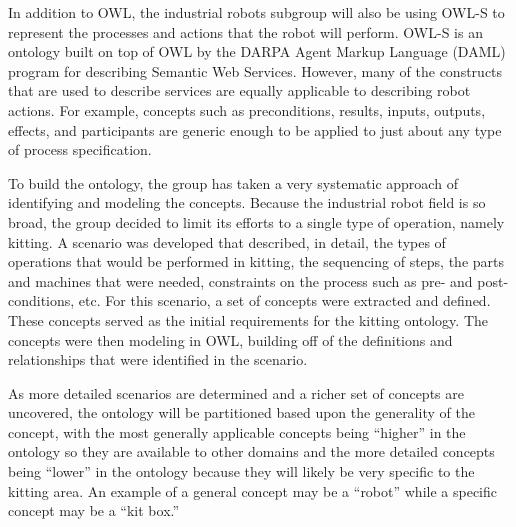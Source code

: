 \documentclass[a4paper, 10pt, conference]{ieeeconf}      %
\begin{document}
In addition to OWL, the industrial robots subgroup will also be using OWL-S \cite{Martin2012} to represent the processes and actions that the robot will perform. OWL-S is an ontology built on top of OWL by the DARPA Agent Markup Language (DAML) program \cite{damlWeb}
for describing Semantic Web Services. However, many of the constructs that are used to describe services are equally applicable to describing robot actions. For example, concepts such as preconditions, results, inputs, outputs, effects, and participants are generic enough to be applied to just about any type of process specification.

To build the ontology, the group has taken a very systematic approach of identifying and modeling the concepts. Because the industrial robot field is so broad, the group decided to limit its efforts to a single type of operation, namely kitting. A scenario was developed that described, in detail, the types of operations that would be performed in kitting, the sequencing of steps, the parts and machines that were needed, constraints on the process such as pre- and post-conditions, etc. For this scenario, a set of concepts were extracted and defined. These concepts served as the initial requirements for the kitting ontology. The concepts were then modeling in OWL, building off of the definitions and relationships that were identified in the scenario.

As more detailed scenarios are determined and a richer set of concepts are uncovered, the ontology will be partitioned based upon the generality of the concept, with the most generally applicable concepts being ``higher'' in the ontology so they are available to other domains and the more detailed concepts being ``lower'' in the ontology because they will likely be very specific to the kitting area. An example of a general concept may be a ``robot'' while a specific concept may be a ``kit box.''
\end{document}
